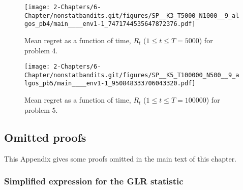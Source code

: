 \begin{figure}[h!]  %
    \centering
    \texttt{[image: 2-Chapters/6-Chapter/nonstatbandits.git/figures/SP\_\_K3\_T5000\_N1000\_\_9\_algos\_pb4/main\_\_\_\_env1-1\_7471744535647872376.pdf]}
    \caption{Mean regret as a function of time, $R_t$ ($1 \leq t \leq T = 5000$) for problem 4.}
    \label{fig:6:meanRegretPb4}
\end{figure}


\begin{figure}[h!]  %
    \centering
    \texttt{[image: 2-Chapters/6-Chapter/nonstatbandits.git/figures/SP\_\_K5\_T100000\_N500\_\_9\_algos\_pb5/main\_\_\_\_env1-1\_950848333706043320.pdf]}
    \caption{Mean regret as a function of time, $R_t$ ($1 \leq t \leq T = 100000$) for problem 5.}
    \label{fig:6:meanRegretPb5}
\end{figure}


\subsection{Omitted proofs}\label{proof:6:Conc}

This Appendix gives some proofs omitted in the main text of this chapter.


\subsubsection{Simplified expression for the GLR statistic}\label{app:6:GLR_with_kl}


